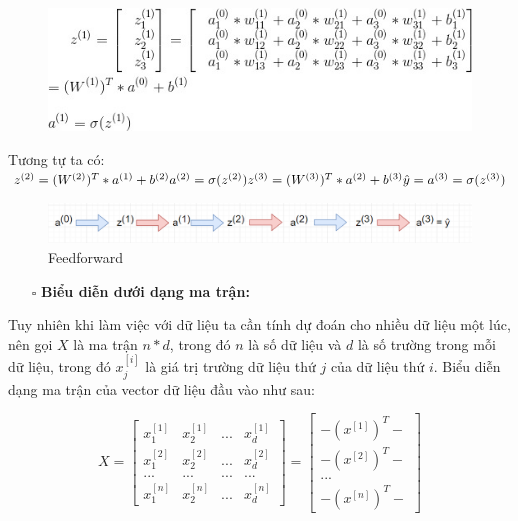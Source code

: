 \FloatBarrier
\begin{figure}[htp]
\begin{center}
\includegraphics[scale=0.8]{chap2/c2_figs/feed_forward.jpg}
\end{center}
\label{fig:feed_forward0}
\end{figure}
\FloatBarrier
Tương tự ta có:
$\newline z^{(2)} = (W^{(2)})^T * a^{(1)} + b^{(2)}\newline  a^{(2)} = \sigma(z^{(2)}) \newline z^{(3)} = (W^{(3)})^T * a^{(2)} + b^{(3)}\newline  \hat{y} = a^{(3)} = \sigma(z^{(3)})$

\FloatBarrier
\begin{figure}[htp]
\begin{center}
\includegraphics[scale=0.75]{chap2/c2_figs/ff.png}
\end{center}
\caption{Feedforward}
\label{fig:feed_forward}
\end{figure}
\FloatBarrier

\begin{itemize}
\item[$\square$] \textbf{Biểu diễn dưới dạng ma trận:}
\end{itemize}
Tuy nhiên khi làm việc với dữ liệu ta cần tính dự đoán cho nhiều dữ liệu một lúc, nên gọi $X$ là ma trận $n*d$, trong đó $n$ là số dữ liệu và $d$ là số trường trong mỗi dữ liệu, trong đó $x_j^{[i]}$ là giá trị trường dữ liệu thứ $j$ của dữ liệu thứ $i$.
Biểu diễn dạng ma trận của vector dữ liệu đầu vào như sau:

$$X = \begin{bmatrix}x_{1}^{[1]}&x_{2}^{[1]}&...&x_{d}^{[1]}\\x_{1}^{[2]}&x_{2}^{[2]}&...&x_{d}^{[2]}\\...&...&...&...\\x_{1}^{[n]}&x_{2}^{[n]}&...&x_{d}^{[n]}\end{bmatrix} =  \begin{bmatrix}-(x^{[1]})^{T}-\\-(x^{[2]})^{T}-\\...\\-(x^{[n]})^{T}-\end{bmatrix} $$

